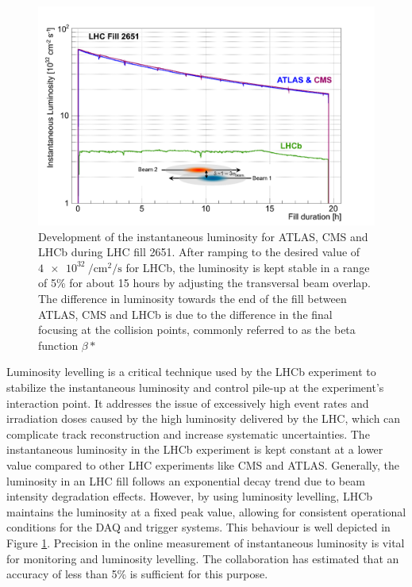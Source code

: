\begin{figure}
    \centering
    \includegraphics[width=\textwidth]{figures/luminosity_leveling.png}
    \caption{Development of the instantaneous luminosity for ATLAS, CMS and LHCb during LHC fill 2651. After ramping to the desired value of $\SI{4e32}{\per\centi\meter\squared\per\second}$ for LHCb, the luminosity is kept stable in a range of 5\% for about 15 hours by adjusting the transversal beam overlap.
    The difference in luminosity towards the end of the fill between ATLAS, CMS and LHCb is due to the difference in the final focusing at the collision points, commonly referred to as the beta function $\beta*$}
    \label{fig:lumi-leveling}
\end{figure}

Luminosity levelling is a critical technique used by the LHCb experiment to stabilize the instantaneous luminosity and control pile-up at the experiment's interaction point. It addresses the issue of excessively high event rates and irradiation doses caused by the high luminosity delivered by the LHC, which can complicate track reconstruction and increase systematic uncertainties.
The instantaneous luminosity in the LHCb experiment is kept constant at a lower value compared to other LHC experiments like CMS and ATLAS. Generally, the luminosity in an LHC fill follows an exponential decay trend due to beam intensity degradation effects. However, by using luminosity levelling, LHCb maintains the luminosity at a fixed peak value, allowing for consistent operational conditions for the DAQ and trigger systems.  This behaviour is well depicted in Figure \ref{fig:lumi-leveling}. Precision in the online measurement of instantaneous luminosity is vital for monitoring and luminosity levelling. The collaboration has estimated that an accuracy of less than 5\% is sufficient for this purpose. 


